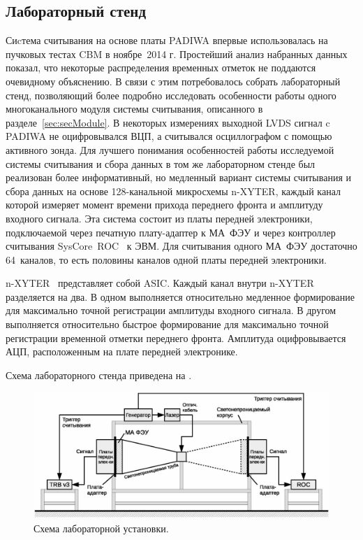 \subsection{Лабораторный стенд}\label{sec:secLabSetup}

Сиcтема считывания на основе платы PADIWA впервые использовалась на пучковых тестах CBM в ноябре~2014 г. Простейший анализ набранных данных показал, что некоторые распределения временных отметок не поддаются очевидному объяснению. В связи с этим потребовалось собрать лабораторный стенд, позволяющий более подробно исследовать особенности работы одного многоканального модуля системы считывания, описанного в разделе~\ref{sec:secModule}. В некоторых измерениях выходной LVDS сигнал c PADIWA не оцифровывался ВЦП, а считывался осциллографом с помощью активного зонда. Для лучшего понимания особенностей работы исследуемой системы считывания и сбора данных в том же лабораторном стенде был реализован более информативный, но медленный вариант системы считывания и сбора данных на основе 128-канальной микросхемы n-XYTER, каждый канал которой измеряет момент времени прихода переднего фронта и амплитуду входного сигнала. Эта система состоит из платы передней электроники, подключаемой через печатную плату-адаптер к МА~ФЭУ и через контроллер считывания SysCore~ROC~\cite{SYSCORE} к ЭВМ. Для считывания одного МА~ФЭУ достаточно 64~каналов, то есть половины каналов одной платы передней электроники.

n-XYTER~\cite{NXYTER} представляет собой ASIC. Каждый канал внутри n-XYTER разделяется на два. В одном выполняется относительно медленное формирование для максимально точной регистрации амплитуды входного сигнала. В другом выполняется относительно быстрое формирование для максимально точной регистрации временной отметки переднего фронта. Амплитуда оцифровывается АЦП, расположенным на плате передней электронике.

Схема лабораторного стенда приведена на .

\begin{figure}[H]
\centering
\includegraphics[width=1.0\textwidth]{pictures/12_Lab_setup_3_rus.eps}
\caption{Схема лабораторной установки.}
\label{fig:LabSetup}
\end{figure}

